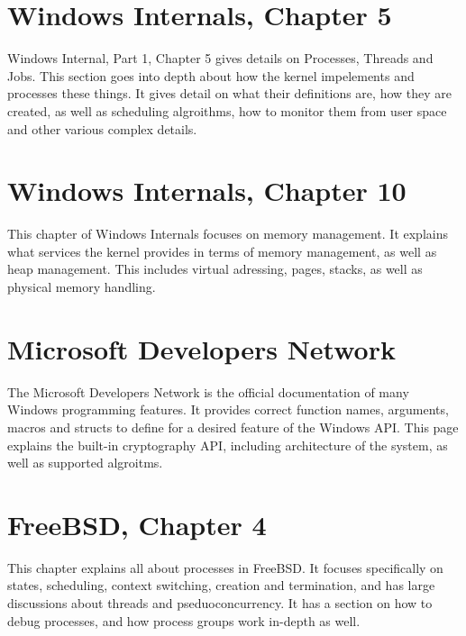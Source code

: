 \documentclass[titlepage]{article}
\begin{document}
\section{Windows Internals, Chapter 5}
\begin{singlespace}
    \cite{windowsch5}Windows Internal, Part 1, Chapter 5 gives details on Processes, Threads and Jobs. This section goes into depth about how the kernel impelements and processes these things. It gives detail on what their definitions are, how they are created, as well as scheduling algroithms, how to monitor them from user space and other various complex details.
\end{singlespace}

\section{Windows Internals, Chapter 10}
\begin{singlespace}
    \cite{windowsch10}This chapter of Windows Internals focuses on memory management. It explains what services the kernel provides in terms of memory management, as well as heap management. This includes virtual adressing, pages, stacks, as well as physical memory handling.
\end{singlespace}

\section{Microsoft Developers Network}
\begin{singlespace}
    \cite{msdn}The Microsoft Developers Network is the official documentation of many Windows programming features. It provides correct function names, arguments, macros and structs to define for a desired feature of the Windows API. This page explains the built-in cryptography API, including architecture of the system, as well as supported algroitms.
\end{singlespace}

\section{FreeBSD, Chapter 4}
\begin{singlespace}
    \cite{freebsdch4}This chapter explains all about processes in FreeBSD. It focuses specifically on states, scheduling, context switching, creation and termination, and has large discussions about threads and pseduoconcurrency. It has a section on how to debug processes, and how process groups work in-depth as well.
\end{singlespace}
\end{document}
